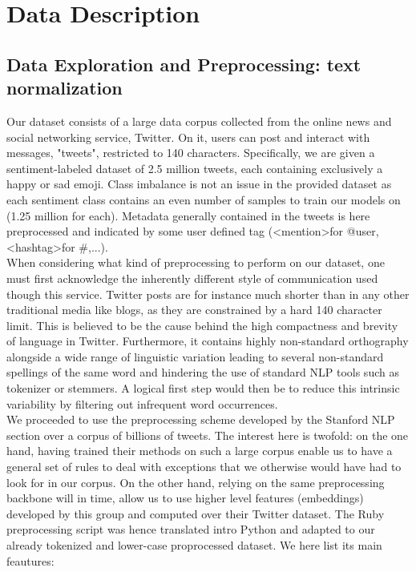 \documentclass[10pt,conference,compsocconf]{IEEEtran}
\begin{document}
\section{Data Description}
 \label{sec:structure-paper}
\subsection{Data Exploration and Preprocessing: text normalization}

Our dataset consists of a large data corpus collected from the online news and social networking service, Twitter. On it, users can post and interact with messages, "tweets", restricted to 140 characters. Specifically, we are given a sentiment-labeled dataset of 2.5 million tweets, each containing exclusively a happy or sad emoji.  Class imbalance is not an issue in the provided dataset as each sentiment class contains an even number of samples to train our models on (1.25 million for each). Metadata generally contained in the tweets is here preprocessed and indicated by some user defined tag (\textless  mention\textgreater for @user, \textless hashtag\textgreater for \#,...).\\

When considering what kind of preprocessing to perform on our dataset, one must first acknowledge the inherently different style of communication used though this service.  Twitter posts are for instance much shorter than in any other traditional media like blogs, as they are constrained by a hard 140 character limit. This is believed to be the cause behind the high compactness and brevity of language in Twitter. Furthermore, it contains highly non-standard orthography alongside a wide range of linguistic variation leading to several non-standard spellings of the same word and hindering the use of standard NLP tools such as tokenizer or stemmers. A logical first step would then be to reduce this intrinsic variability by filtering out infrequent word occurrences.\\

We proceeded to use the preprocessing scheme developed by the Stanford NLP section over a corpus of billions of tweets. The interest here is twofold: on the one hand,  having trained their methods on such a large corpus enable us to have a general set of rules to deal with exceptions that we otherwise would have had to look for in our corpus. On the other hand, relying on the same preprocessing backbone will in time, allow us to use higher level features (embeddings) developed by this group and computed over their Twitter dataset. The Ruby preprocessing script was hence translated intro Python and adapted to our already tokenized and lower-case proprocessed dataset. We here list its main feautures:
\end{document}
